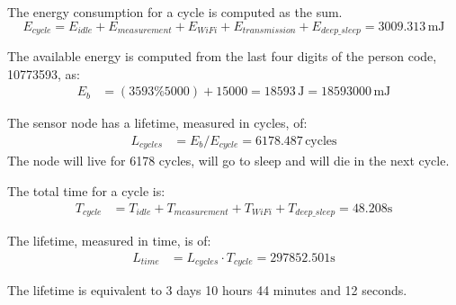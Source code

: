 The energy consumption for a cycle is computed as the sum.
\[
E_{cycle} = E_{idle} + E_{measurement} + E_{WiFi} + E_{transmission} + E_{deep\_sleep} = 3009.313\,\text{mJ} 
\]

The available energy is computed from the last four digits of the person code, 10773593, as: 
\begin{align*}
	E_{b} &= (3593 \% 5000) + 15000 = 18593\,\text{J} = 18593000\,\text{mJ}
\end{align*}

The sensor node has a lifetime, measured in cycles, of:
\begin{align*}
	L_{cycles}&= E_{b}/E_{cycle} = 6178.487 \,\text{cycles} 
\end{align*}
The node will live for 6178 cycles, will go to sleep and will die in the next cycle.

The total time for a cycle is:
\begin{align*}
	T_{cycle} &= T_{idle} + T_{measurement} + T_{WiFi} + T_{deep\_sleep} = 48.208 \text{s}
\end{align*}

The lifetime, measured in time, is of:
\begin{align*}
	L_{time}&= L_{cycles} \cdot T_{cycle} = 297852.501 \text{s}
\end{align*}

The lifetime is equivalent to 3 days 10 hours 44 minutes and 12 seconds.


